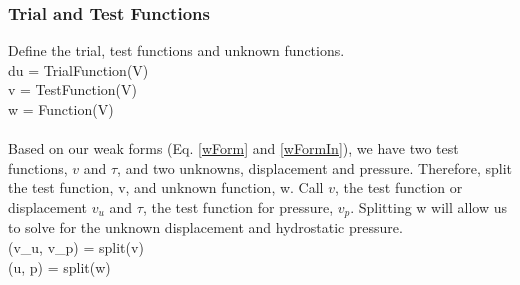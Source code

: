 \documentclass[12pt,3p]{article}
\begin{document}
\subsubsection{Trial and Test Functions}
Define the trial, test functions and unknown functions.  \\ 
{\selectfont
du = TrialFunction(V) \\
v  = TestFunction(V) \\          
w  = Function(V) \\ \\
}
Based on our weak forms (Eq. \ref{wForm} and \ref{wFormIn}), we have two test functions, $v$ and $\tau$, and two unknowns, displacement and pressure. Therefore, split the test function, v, and unknown function, w.
Call $v$, the test function or displacement $v_u$ and $\tau$, the test function for pressure, $v_p$. Splitting w will allow us to solve for the unknown displacement and hydrostatic pressure. \\
{\selectfont
(v\_u, v\_p) = split(v) \\          
(u, p) = split(w) 
}
\end{document}
